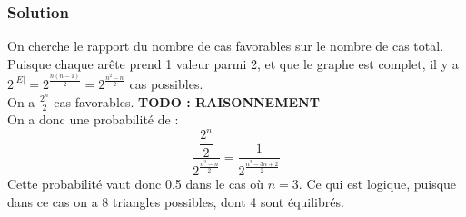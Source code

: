     \subsubsection*{Solution}
    On cherche le rapport du nombre de cas favorables sur le nombre de cas total.\\
    Puisque chaque arête prend 1 valeur parmi 2, et que le graphe est complet, il y a $2^{|E|} = 2^{\frac{n(n-1)}{2}} = 2^{\frac{n^2-n}{2}}$ cas possibles.\\
    On a $\frac{2^n}{2}$ cas favorables. \textbf{TODO : RAISONNEMENT}\\
    On a donc une probabilité de :
    $$ \dfrac{\dfrac{2^n}{2}}{2^{\frac{n^2-n}{2}}} = \dfrac{1}{2^{\frac{n^2-3n+2}{2}}}$$
    \noindent Cette probabilité vaut donc 0.5 dans le cas où $n=3$.
    Ce qui est logique, puisque dans ce cas on a 8 triangles possibles, dont 4 sont équilibrés.



